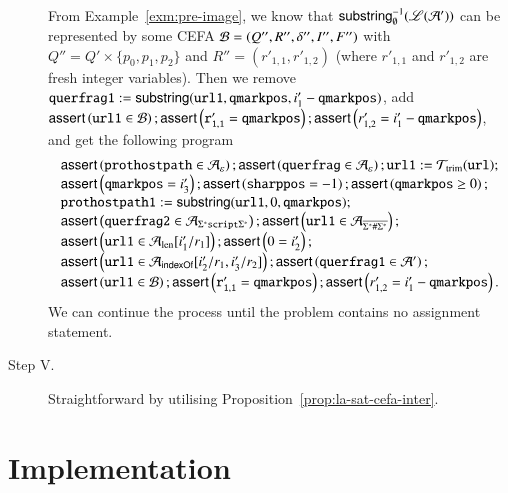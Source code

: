\begin{description}
		From Example~\ref{exm:pre-image}, we know that $\mathsf{substring}^{-1}_\emptyset(\mathscr{L}(\mathcal{A}'))$ can be represented by some CEFA $\mathcal{B}=(Q'', R'', \delta'', I'', F'')$ with $Q''= Q' \times \{p_0,p_1,p_2\}$ and $R''=(r'_{1,1}, r'_{1,2})$ (where $r'_{1,1}$ and $r'_{1,2}$ are fresh integer variables). Then we remove $\mathtt{querfrag1} := \mathsf{substring}(\mathtt{url1, qmarkpos}, i'_1 - \mathtt{qmarkpos})$, add $\textsf{assert}\left(\mathtt{url1} \in \mathcal{B}\right);\textsf{assert}\left(\mathtt{r'_{1,1}= qmarkpos}\right); \textsf{assert}\left(r'_{1,2}=i'_1 - \mathtt{qmarkpos}\right)$, and get the following program
		\[ 
		\begin{array}{l}
		\textsf{assert}\left(\mathtt{prothostpath} \in \mathcal{A}_\varepsilon\right); \textsf{assert}\left(\mathtt{querfrag} \in \mathcal{A}_\varepsilon\right); \mathtt{url1} := \mathcal{T}_{\rm trim}(\mathtt{url}); \\
		\textsf{assert}\left(\mathtt{qmarkpos} = i'_3\right); \textsf{assert}\left(\mathtt{sharppos} =-1 \right); \textsf{assert}\left(\mathtt{qmarkpos} \ge 0\right); \\ 
		\mathtt{prothostpath1} := \mathsf{substring}(\mathtt{url1}, 0, \mathtt{qmarkpos});\\
		\textsf{assert}\left(\mathtt{querfrag2} \in  \mathcal{A}_{\Sigma^*\mathtt{script}\Sigma^*}\right);  
		\textsf{assert}\left(\mathtt{url1} \in  \mathcal{A}_{\overline{\Sigma^*\#\Sigma^*}}\right); \\
		\textsf{assert}\left(\mathtt{url1} \in \mathcal{A}_{\rm len}[i'_1/r_1]\right);  \textsf{assert}\left(0= i'_2\right); \\
		\textsf{assert}\left(\mathtt{url1} \in \mathcal{A}_{\mathsf{indexOf}}[i'_2/r_1, i'_3/r_2]\right);  \textsf{assert}\left(\mathtt{querfrag1} \in \mathcal{A}'\right);\\
		\textsf{assert}\left(\mathtt{url1} \in \mathcal{B}\right);\textsf{assert}\left(\mathtt{r'_{1,1} = qmarkpos} \right); \textsf{assert}\left(r'_{1,2}=i'_1 - \mathtt{qmarkpos}\right).
		\end{array}
		\]
		We can continue the process until the problem contains no assignment statement.
		\item[Step V.]  Straightforward by utilising Proposition~\ref{prop:la-sat-cefa-inter}. 
	\end{description}

\section{Implementation} \label{appendix:impl}
%








